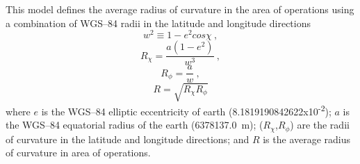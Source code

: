 \documentclass{ws-jca}
\begin{document}
This model defines the average radius of curvature in the area of
operations using a combination of WGS--84 radii in the latitude and
longitude directions\cite{Jones1986}
\begin{equation}
	w^2 \equiv 1 - e^2 cos\chi \:,
	\label{eq:w^2}
\end{equation}
\begin{equation}
	R_\chi = \frac{a(1-e^2)}{w^3} \:,
	\label{eq:R_chi}
\end{equation}
\begin{equation}
	R_\phi = \frac{a}{w} \:,
	\label{eq:R_phi}
\end{equation}
\begin{equation}
	R = \sqrt{ R_\chi R_\phi }
	\label{eq:Rtotal}
\end{equation}
where 
$e$ is the WGS--84 elliptic eccentricity of earth (8.1819190842622x10\textsuperscript{-2});
$a$ is the WGS--84 equatorial radius of the earth (6378137.0~m);
(\(R_\chi\),\(R_\phi\)) are the radii of curvature in the latitude and longitude directions; 
and $R$ is the average radius of curvature in area of operations.  
\end{document}

